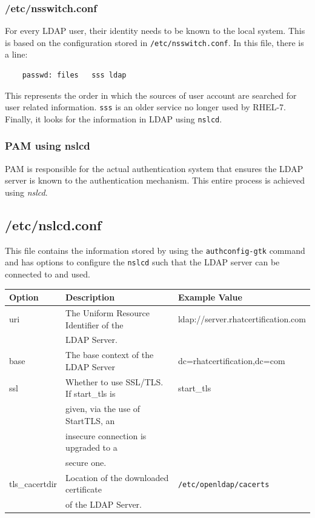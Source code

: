 \documentclass{report}
\begin{document}
	\subsubsection{/etc/nsswitch.conf}
	For every LDAP user, their identity needs to be known to the local system. This is based on the configuration stored in \verb|/etc/nsswitch.conf|. In this file, there is a line:
	
	\vspace{-15pt}
	\begin{verbatim}
	passwd:	files	sss	ldap
	\end{verbatim}
	\vspace{-10pt}
	
	This represents the order in which the sources of user account are searched for user related information. \verb|sss| is an older service no longer used by RHEL-7. Finally, it looks for the information in LDAP using \verb|nslcd|.
	
	\subsubsection{PAM using nslcd}
	PAM is responsible for the actual authentication system that ensures the LDAP server is known to the authentication mechanism. This entire process is achieved using \textit{nslcd}. 
	
	\subsection{/etc/nslcd.conf}
	This file contains the information stored by using the \verb|authconfig-gtk| command and has options to configure the \verb|nslcd| such that the LDAP server can be connected to and used. 
		
	\noindent
	\begin{tabular}{lll}
		\toprule
		\textbf{Option} &\textbf{Description} &\textbf{Example Value}\\
		\midrule
		uri &The Uniform Resource Identifier of the  &ldap://server.rhatcertification.com \\
		&LDAP Server. & \\
		base &The base context of the LDAP Server &dc=rhatcertification,dc=com \\
		ssl &Whether to use SSL/TLS. If start\_tls is &start\_tls \\
		&given, via the use of StartTLS, an & \\
		&insecure connection is upgraded to a &\\
		& secure one. &\\
		tls\_cacertdir &Location of the downloaded certificate &\verb|/etc/openldap/cacerts| \\
		&of the LDAP Server. &\\
		\bottomrule
	\end{tabular}
\end{document}
